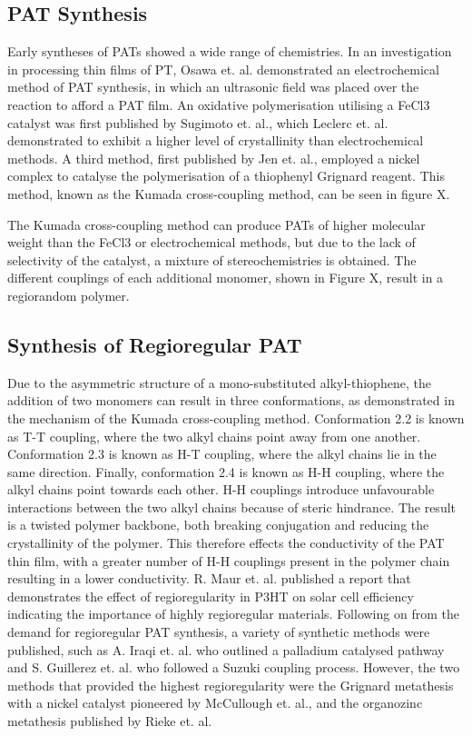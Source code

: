 \subsection{PAT Synthesis}

Early syntheses of PATs showed a wide range of chemistries. In an investigation in processing thin films of PT, Osawa et. al. demonstrated an electrochemical method of PAT synthesis, in which an ultrasonic field was placed over the reaction to afford a PAT film. An oxidative polymerisation utilising a FeCl3 catalyst was first published by Sugimoto et. al., which Leclerc et. al. demonstrated to exhibit a higher level of crystallinity than electrochemical methods. A third method, first published by Jen et. al., employed a nickel complex to catalyse the polymerisation of a thiophenyl Grignard reagent. This method, known as the Kumada cross-coupling method, can be seen in figure X.

The Kumada cross-coupling method can produce PATs of higher molecular weight than the FeCl3 or electrochemical methods, but due to the lack of selectivity of the catalyst, a mixture of stereochemistries is obtained. The different couplings of each additional monomer, shown in Figure X, result in a regiorandom polymer.

\subsection{Synthesis of Regioregular PAT}

Due to the asymmetric structure of a mono-substituted alkyl-thiophene, the addition of two monomers can result in three conformations, as demonstrated in the mechanism of the Kumada cross-coupling method. Conformation 2.2 is known as T-T coupling, where the two alkyl chains point away from one another. Conformation 2.3 is known as H-T coupling, where the alkyl chains lie in the same direction. Finally, conformation 2.4 is known as H-H coupling, where the alkyl chains point towards each other. H-H couplings introduce unfavourable interactions between the two alkyl chains because of steric hindrance. The result is a twisted polymer backbone, both breaking conjugation and reducing the crystallinity of the polymer. This therefore effects the conductivity of the PAT thin film, with a greater number of H-H couplings present in the polymer chain resulting in a lower conductivity. R. Maur et. al. published a report that demonstrates the effect of regioregularity in P3HT on solar cell efficiency indicating the importance of highly regioregular materials. 
Following on from the demand for regioregular PAT synthesis, a variety of synthetic methods were published, such as A. Iraqi et. al. who outlined a palladium catalysed pathway and S. Guillerez et. al. who followed a Suzuki coupling process. However, the two methods that provided the highest regioregularity were the Grignard metathesis with a nickel catalyst pioneered by McCullough et. al., and the organozinc metathesis published by Rieke et. al.

